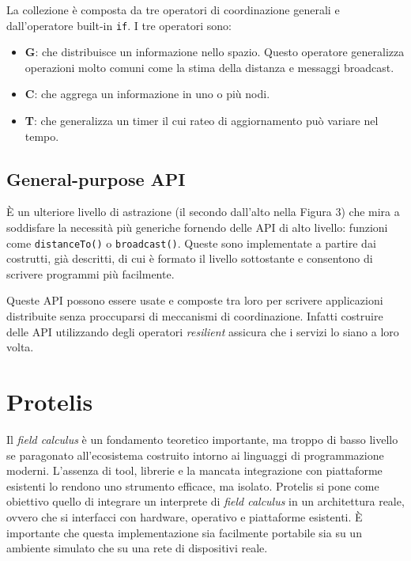 La collezione è composta da tre operatori di coordinazione generali e
dall'operatore built-in \texttt{if}. I tre operatori sono:
\begin{itemize}
\item \textbf{G}: che distribuisce un informazione nello spazio. Questo
  operatore generalizza operazioni molto comuni come la stima della distanza e
  messaggi broadcast.
\item \textbf{C}: che aggrega un informazione in uno o più nodi.
\item \textbf{T}: che generalizza un timer il cui rateo di aggiornamento può
  variare nel tempo.
\end{itemize}

\subsection{General-purpose API}
È un ulteriore livello di astrazione (il secondo dall'alto nella Figura 3) che
mira a soddisfare la necessità più generiche fornendo delle API di alto livello:
funzioni come \texttt{distanceTo()} o \texttt{broadcast()}. Queste sono
implementate a partire dai costrutti, già descritti, di cui è formato il livello
sottostante e consentono di scrivere programmi più facilmente.

Queste API possono essere usate e composte tra loro per scrivere applicazioni
distribuite senza proccuparsi di meccanismi di coordinazione. Infatti costruire
delle API utilizzando degli operatori \textit{resilient} assicura che i servizi
lo siano a loro volta.

\section{Protelis}
Il \textit{field calculus} è un fondamento teoretico importante, ma troppo di
basso livello se paragonato all'ecosistema costruito intorno ai linguaggi di
programmazione moderni. L'assenza di tool, librerie e la mancata integrazione
con piattaforme esistenti lo rendono uno strumento efficace, ma
isolato. Protelis si pone come obiettivo quello di integrare un interprete di
\textit{field calculus} in un architettura reale, ovvero che si interfacci con
hardware, operativo e piattaforme esistenti. È importante che questa
implementazione sia facilmente portabile sia su un ambiente simulato che su una
rete di dispositivi reale.


